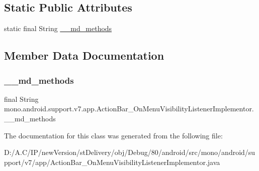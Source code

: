 \subsection*{Static Public Attributes}
\begin{DoxyCompactItemize}
\item 
static final String \hyperlink{classmono_1_1android_1_1support_1_1v7_1_1app_1_1_action_bar___on_menu_visibility_listener_implementor_a4514956c1b3554e5301274b9b8fb213f}{\+\_\+\+\_\+md\+\_\+methods}
\end{DoxyCompactItemize}


\subsection{Member Data Documentation}
\mbox{\label{classmono_1_1android_1_1support_1_1v7_1_1app_1_1_action_bar___on_menu_visibility_listener_implementor_a4514956c1b3554e5301274b9b8fb213f}} 
\subsubsection{\texorpdfstring{\+\_\+\+\_\+md\+\_\+methods}{\_\_md\_methods}}
{\footnotesize\ttfamily final String mono.\+android.\+support.\+v7.\+app.\+Action\+Bar\+\_\+\+On\+Menu\+Visibility\+Listener\+Implementor.\+\_\+\+\_\+md\+\_\+methods\hspace{0.3cm}{\ttfamily [static]}}



The documentation for this class was generated from the following file\+:\begin{DoxyCompactItemize}
\item 
D\+:/\+A.\+C/\+I\+P/new\+Version/st\+Delivery/obj/\+Debug/80/android/src/mono/android/support/v7/app/Action\+Bar\+\_\+\+On\+Menu\+Visibility\+Listener\+Implementor.\+java\end{DoxyCompactItemize}
